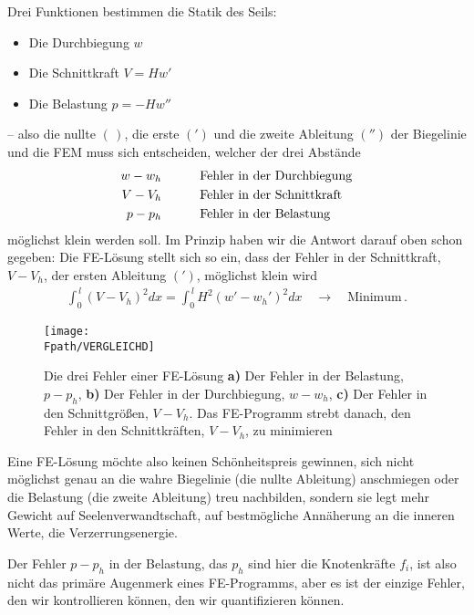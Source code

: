 Drei Funktionen bestimmen die Statik des Seils:\\
\begin{itemize}
\item{Die Durchbiegung $w$}
\item{Die Schnittkraft $V = H w' $ }
\item{Die Belastung $p = - H w''$}
\end{itemize}
-- also die nullte $(\,)$, die erste $(')$ und die zweite Ableitung $('')$ der Biegelinie und die FEM muss sich entscheiden, welcher der drei Abst\"{a}nde
\begin{alignat}{2}
w - w_{h} &\qquad && \textrm{Fehler in der Durchbiegung} \nonumber\\
V - V_{h} &\qquad && \textrm{Fehler in der Schnittkraft} \nonumber\\
p - p_{h} &\qquad &&\textrm{Fehler in der Belastung}\nonumber
\end{alignat}
m\"{o}glichst klein werden soll. Im Prinzip haben wir die Antwort darauf oben schon gegeben: Die FE-L\"{o}sung stellt sich so ein, dass der Fehler in der Schnittkraft, $V- V_h$, der ersten Ableitung $(')$, m\"{o}glichst klein wird
\begin{align}
 \int_0^{\,l} (V - V_h)^2 dx = \int_0^{\,l} H^2
(w{'} - w_h')^2 dx \quad \rightarrow \quad \mbox{Minimum}\,.
\end{align}
\begin{figure}[tbp] \centering
\if {} \sidecaption \fi
\texttt{[image: \\Fpath/VERGLEICHD]}
\caption{ Die drei Fehler einer FE-L\"{o}sung {\bf a)} Der Fehler in der Belastung, $p -
p_h$, {\bf b)} Der Fehler in der Durchbiegung, $w - w_h$, {\bf c)} Der Fehler in den
Schnittgr\"{o}{\ss}en, $V - V_h$. Das FE-Programm strebt danach, den Fehler in den
Schnittkr\"{a}ften, $V-V_{h} $, zu minimieren} \label{Vergleich}
\end{figure}%
Eine FE-L\"{o}sung m\"{o}chte also keinen Sch\"{o}nheitspreis gewinnen, sich nicht m\"{o}glichst genau an die wahre Biegelinie (die nullte Ableitung) anschmiegen oder die Belastung (die zweite Ableitung) treu nachbilden, sondern sie legt mehr Gewicht auf Seelenverwandtschaft, auf bestm\"{o}gliche Ann\"{a}herung an die inneren Werte, die Verzerrungsenergie.

Der Fehler $p - p_h$ in der Belastung, das $p_h$ sind hier die Knotenkr\"{a}fte $f_i$, ist also nicht das prim\"{a}re Augenmerk eines FE-Programms, aber es ist der einzige Fehler, den wir kontrollieren k\"{o}nnen, den wir quantifizieren k\"{o}nnen.

